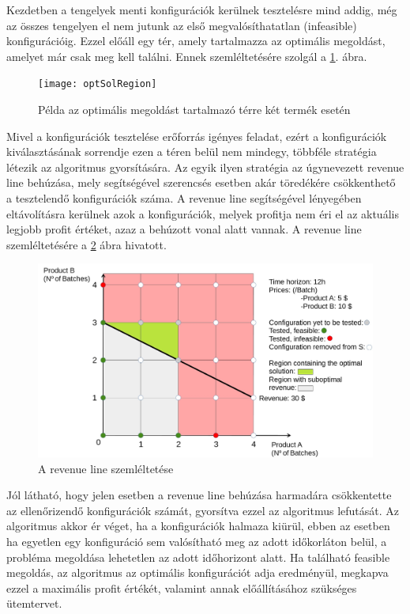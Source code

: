 Kezdetben a tengelyek menti konfigurációk kerülnek tesztelésre mind addig, még az összes tengelyen el nem jutunk az első megvalósíthatatlan (infeasible) konfigurációig.
Ezzel előáll egy tér, amely tartalmazza az optimális megoldást, amelyet már csak meg kell találni.
Ennek szemléltetésére szolgál a \ref{optSolRegion}.  ábra.
 \begin{figure}[H]
\begin{center}
\texttt{[image: optSolRegion]}
\caption{Példa az optimális megoldást tartalmazó térre két termék esetén}
\label{optSolRegion}
\end{center}
\end{figure}
Mivel a konfigurációk tesztelése erőforrás igényes feladat, ezért a konfigurációk kiválasztásának sorrendje ezen a téren belül nem mindegy, többféle stratégia létezik az algoritmus gyorsítására. \cite{phd_Hegyhati}
Az egyik ilyen stratégia az úgynevezett revenue line behúzása, mely segítségével szerencsés esetben akár töredékére csökkenthető a tesztelendő konfigurációk száma.
A revenue line segítségével lényegében eltávolításra kerülnek azok a konfigurációk, melyek profitja nem éri el az aktuális legjobb profit értéket, azaz a behúzott vonal alatt vannak.
A revenue line szemléltetésére a \ref{revLine} ábra hivatott.
 \begin{figure}[H]
\begin{center}
\includegraphics[scale=0.4]{revLine}
\caption{A revenue line szemléltetése}
\label{revLine}
\end{center}
\end{figure}
Jól látható, hogy jelen esetben a revenue line behúzása harmadára csökkentette az ellenőrizendő konfigurációk számát, gyorsítva ezzel az algoritmus lefutását.
Az algoritmus akkor ér véget, ha a konfigurációk halmaza kiürül, ebben az esetben ha egyetlen egy konfiguráció sem valósítható meg az adott időkorláton belül, a probléma megoldása lehetetlen az adott időhorizont alatt.
Ha található feasible megoldás, az algoritmus az optimális konfigurációt adja eredményül, megkapva ezzel a maximális profit értékét, valamint annak előállításához szükséges ütemtervet.